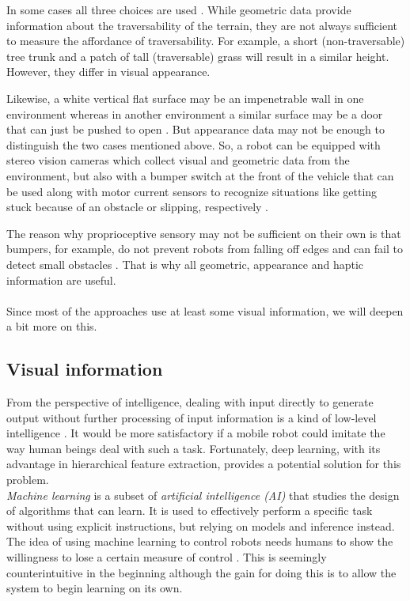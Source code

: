 \documentclass[12pt,a4paper,table,dvipsnames,tikz]{report}
\newcommand{\term}{\textit}
\newcommand{\acronym}{\MakeUppercase}
\begin{document}
	In some cases all three choices are used \citep{Kim, Shneier}. While geometric 
	data provide information about the traversability of the terrain, they are 
	not always sufficient to measure the affordance of traversability. For 
	example, a short (non-traversable) tree trunk and a patch of tall (traversable) 
	grass will result in a similar height. However, they differ in visual 
	appearance. 
	\par 
	Likewise, a white vertical flat surface may be an impenetrable wall in one 
	environment whereas in another environment a similar surface may be a door that 
	can just be pushed to open \citep{Ugur}. But appearance data may not be enough 
	to distinguish the two cases mentioned above. So, a robot can be equipped with 
	stereo vision cameras which collect visual and geometric data from the 
	environment, but also with a bumper switch at the front of the vehicle that can 
	be used along with motor current sensors to recognize situations like getting 
	stuck because of an obstacle or slipping, respectively \citep{Kim}.
	\par
	The reason why proprioceptive sensory may not be sufficient on their own is that 
	bumpers, for example, do not prevent robots from falling off edges and can fail 
	to detect small obstacles \citep{HiroseGonet}. That is why all geometric, 
	appearance and haptic information are useful.
	\\\\
	
	
	Since most of the approaches use at least some visual information, we will 
	deepen a bit more on this.
	\\
	
	\subsection{Visual information}
	\label{sec:bg:data:neural}
	
	From the perspective of intelligence, dealing with input directly to generate 
	output without further processing of input information is a kind of	low-level 
	intelligence \citep{Tai}. It would be more satisfactory if a mobile robot could 
	imitate the way human beings deal with such a task. Fortunately, deep learning, 
	with its advantage in hierarchical feature extraction, provides a potential 
	solution for this problem.
	\\
	
	\term{Machine learning} is a subset of \term{artificial intelligence (\acronym{ai})} 
	that studies the design of algorithms that can learn. It is used to effectively 
	perform a specific task without using explicit instructions, but relying on 
	models and inference instead. The idea of using machine learning to control 
	robots needs humans to show the willingness to lose a certain measure of control 
	\citep{Shabbir}. This is seemingly counterintuitive in the beginning although the 
	gain for doing this is to allow the system to begin learning on its own.
	\\
	
\end{document}
